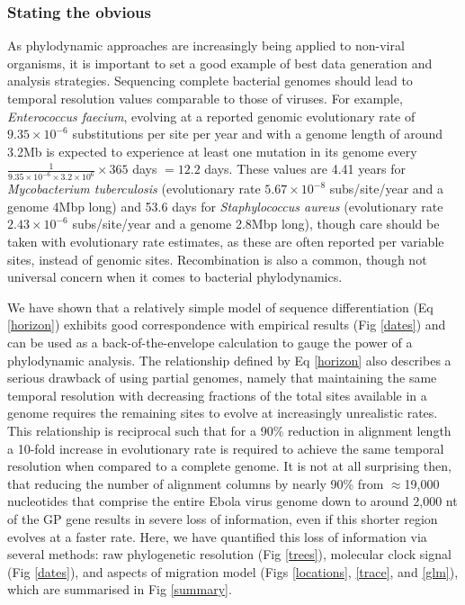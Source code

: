 \documentclass{bmcart}
\begin{document}
\subsubsection*{Stating the obvious}
As phylodynamic approaches are increasingly being applied to non-viral organisms, it is important to set a good example of best data generation and analysis strategies.
Sequencing complete bacterial genomes should lead to temporal resolution values comparable to those of viruses.
For example, \textit{Enterococcus faecium}, evolving at a reported genomic evolutionary rate of $9.35 \times 10^{-6}$ substitutions per site per year \cite{duchene_genome-scale_2016} and with a genome length of around 3.2Mb is expected to experience at least one mutation in its genome every $\frac{1}{9.35 \times 10^{-6} \times 3.2 \times 10^{6}} \times 365$ days $= 12.2$ days.
These values are 4.41 years for \textit{Mycobacterium tuberculosis} (evolutionary rate $5.67 \times 10^{-8}$ subs/site/year \cite{duchene_genome-scale_2016} and a genome 4Mbp long) and 53.6 days for \textit{Staphylococcus aureus} (evolutionary rate $2.43 \times 10^{-6}$ subs/site/year \cite{duchene_genome-scale_2016} and a genome 2.8Mbp long), though care should be taken with evolutionary rate estimates, as these are often reported per variable sites, instead of genomic sites.
Recombination is also a common, though not universal concern when it comes to bacterial phylodynamics.

We have shown that a relatively simple model of sequence differentiation (Eq \ref{horizon}) exhibits good correspondence with empirical results (Fig \ref{dates}) and can be used as a back-of-the-envelope calculation to gauge the power of a phylodynamic analysis.
The relationship defined by Eq \ref{horizon} also describes a serious drawback of using partial genomes, namely that maintaining the same temporal resolution with decreasing fractions of the total sites available in a genome requires the remaining sites to evolve at increasingly unrealistic rates.
This relationship is reciprocal such that for a 90\% reduction in alignment length a 10-fold increase in evolutionary rate is required to achieve the same temporal resolution when compared to a complete genome.
It is not at all surprising then, that reducing the number of alignment columns by nearly 90\% from $\approx$19,000 nucleotides that comprise the entire Ebola virus genome down to around 2,000 nt of the GP gene results in severe loss of information, even if this shorter region evolves at a faster rate.
Here, we have quantified this loss of information via several methods: raw phylogenetic resolution (Fig \ref{trees}), molecular clock signal (Fig \ref{dates}), and aspects of migration model (Figs \ref{locations}, \ref{trace}, and \ref{glm}), which are summarised in Fig \ref{summary}.
\end{document}
